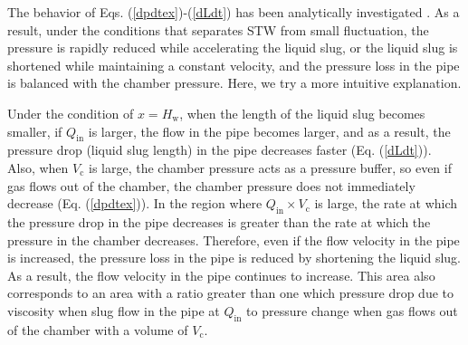 \documentclass[aps,pre,preprint,groupedaddress,showkeys]{revtex4-2}
\begin{document}
The behavior of Eqs. (\ref{dpdtex})-(\ref{dLdt}) has been analytically investigated \citep{kanno2018}.
As a result, under the conditions that separates STW from small fluctuation, the pressure is rapidly reduced while accelerating the liquid slug, or the liquid slug is shortened while maintaining a constant velocity, and the pressure loss in the pipe is balanced with the chamber pressure.
Here, we try a more intuitive explanation.

Under the condition of $ x = H_ \mathrm{w}$, when the length of the liquid slug becomes smaller, if $ Q_ \mathrm {in}$ is larger, the flow in the pipe becomes larger, and as a result, the pressure drop (liquid slug length) in the pipe decreases faster (Eq. (\ref{dLdt})).
Also, when $ V_ \mathrm{c} $ is large, the chamber pressure acts as a pressure buffer, so even if gas flows out of the chamber, the chamber pressure does not immediately decrease (Eq. (\ref{dpdtex})).
In the region where $ Q_ \mathrm{in} \times V_ \mathrm {c} $ is large, the rate at which the pressure drop in the pipe decreases is greater than the rate at which the pressure in the chamber decreases.
Therefore, even if the flow velocity in the pipe is increased, the pressure loss in the pipe is reduced by shortening the liquid slug.
As a result, the flow velocity in the pipe continues to increase.
This area also corresponds to an area with a ratio greater than one which pressure drop due to viscosity when slug flow in the pipe at $Q_ \mathrm {in}$ to pressure change when gas flows out of the chamber with a volume of $V_\mathrm {c}$.
\end{document}
